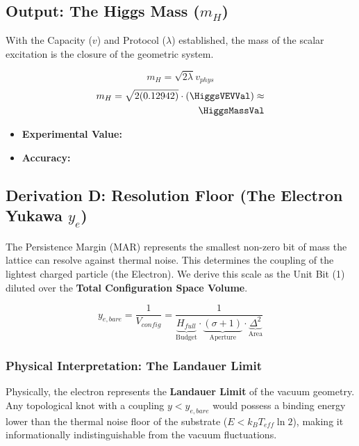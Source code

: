 \subsection{Output: The Higgs Mass (\texorpdfstring{$m_H$}{mH})}
With the Capacity ($v$) and Protocol ($\lambda$) established, the mass of the scalar excitation is the closure of the geometric system.

\begin{equation}
m_H = \sqrt{2\lambda} v_{phys}
\end{equation}
\begin{equation}
\begin{split}
m_H = \sqrt{2 (0.12942)} \cdot (\HiggsVEVVal) \approx \\
\mathbf{\HiggsMassVal}
\end{split}
\end{equation}

\begin{itemize}
    \item \textbf{Experimental Value:} \HiggsMassExperimentalValue
    \item \textbf{Accuracy:} \HiggsMassAccText
\end{itemize}


\subsection{Derivation D: Resolution Floor (The Electron Yukawa \texorpdfstring{$y_e$}{ye})}

The Persistence Margin (MAR) represents the smallest non-zero bit of mass the lattice can resolve against thermal noise. This determines the coupling of the lightest charged particle (the Electron). We derive this scale as the Unit Bit (1) diluted over the \textbf{Total Configuration Space Volume}.

\begin{equation}
y_{e,bare} = \frac{1}{V_{config}} = \frac{1}{\underbrace{H_{full}}_{\text{Budget}} \cdot \underbrace{(\sigma+1)}_{\text{Aperture}} \cdot \underbrace{\Delta^2}_{\text{Area}}}
\end{equation}

\subsubsection{Physical Interpretation: The Landauer Limit}
Physically, the electron represents the \textbf{Landauer Limit} of the vacuum geometry. Any topological knot with a coupling $y < y_{e,bare}$ would possess a binding energy lower than the thermal noise floor of the substrate ($E < k_B T_{eff} \ln 2$), making it informationally indistinguishable from the vacuum fluctuations.

